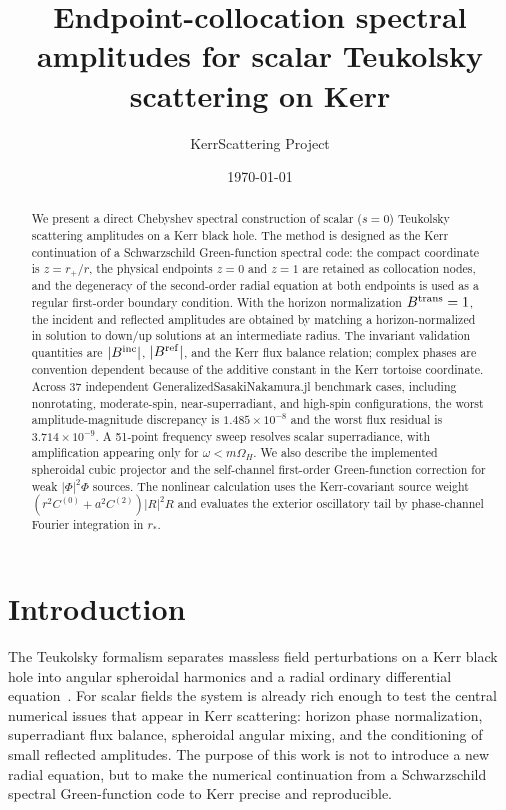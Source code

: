\documentclass[aps,prd,twocolumn,nofootinbib,superscriptaddress,10pt]{revtex4-2}
\newcommand{\rp}{r_+}
\newcommand{\Bin}{B^{\rm inc}}
\newcommand{\Bref}{B^{\rm ref}}
\newcommand{\Btrans}{B^{\rm trans}}
\begin{document}
\title{Endpoint-collocation spectral amplitudes for scalar Teukolsky scattering on Kerr}

\author{KerrScattering Project}

\date{\today}

\begin{abstract}
We present a direct Chebyshev spectral construction of scalar
($s=0$) Teukolsky scattering amplitudes on a Kerr black hole.  The method is
designed as the Kerr continuation of a Schwarzschild Green-function spectral
code: the compact coordinate is $z=\rp/r$, the physical endpoints $z=0$ and
$z=1$ are retained as collocation nodes, and the degeneracy of the second-order
radial equation at both endpoints is used as a regular first-order boundary
condition.  With the horizon normalization $\Btrans=1$, the incident and
reflected amplitudes are obtained by matching a horizon-normalized in solution
to down/up solutions at an intermediate radius.  The invariant validation
quantities are $|\Bin|$, $|\Bref|$, and the Kerr flux balance relation; complex
phases are convention dependent because of the additive constant in the Kerr
tortoise coordinate.  Across 37 independent GeneralizedSasakiNakamura.jl
benchmark cases, including nonrotating, moderate-spin, near-superradiant, and
high-spin configurations, the worst amplitude-magnitude discrepancy is
$1.485\times 10^{-8}$ and the worst flux residual is
$3.714\times 10^{-9}$.  A 51-point frequency sweep resolves scalar
superradiance, with amplification appearing only for
$\omega<m\Omega_H$.  We also describe the implemented spheroidal cubic
projector and the self-channel first-order Green-function correction for weak
$|\Phi|^2\Phi$ sources.  The nonlinear calculation uses the Kerr-covariant
source weight $(r^2C^{(0)}+a^2C^{(2)})|R|^2R$ and evaluates the exterior
oscillatory tail by phase-channel Fourier integration in $r_*$.
\end{abstract}

\maketitle

\section{Introduction}

The Teukolsky formalism separates massless field perturbations on a Kerr black
hole into angular spheroidal harmonics and a radial ordinary differential
equation~\cite{Teukolsky1973}.  For scalar fields the system is already rich
enough to test the central numerical issues that appear in Kerr scattering:
horizon phase normalization, superradiant flux balance, spheroidal angular
mixing, and the conditioning of small reflected amplitudes.  The purpose of
this work is not to introduce a new radial equation, but to make the numerical
continuation from a Schwarzschild spectral Green-function code to Kerr precise
and reproducible.
\end{document}
